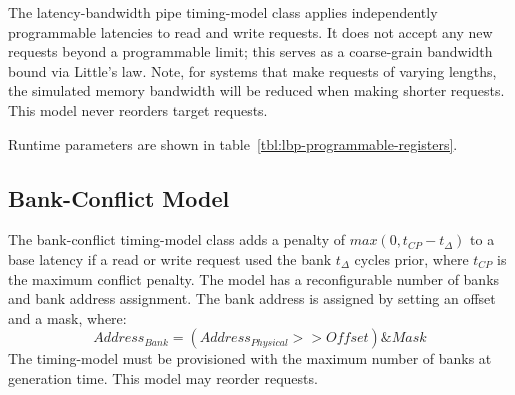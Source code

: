 The latency-bandwidth pipe timing-model class applies independently
programmable latencies to read and write requests. It does not accept any new
requests beyond a programmable limit; this serves as a coarse-grain bandwidth
bound via Little's law. Note, for systems that make requests of varying
lengths, the simulated memory bandwidth will be reduced when making shorter
requests. This model never reorders target requests.

\noindent Runtime parameters are shown in table~\ref{tbl:lbp-programmable-registers}.

\begin{table}
\begin{center}
\end{center}
\caption{Programmable registers of the latency-bandwidth pipe.}
\label{tbl:lbp-programmable-registers}
\end{table}%

\clearpage
\subsection{Bank-Conflict Model}\label{sec:bank-conflict}

The bank-conflict timing-model class adds a penalty of $max(0, t_{CP} - t_{\Delta})$ to a
base latency if a read or write request used the bank $t_{\Delta}$ cycles
prior, where $t_{CP}$ is the maximum conflict penalty. The model has a
reconfigurable number of banks and bank address assignment.  The bank address
is assigned by setting an offset and a mask, where: $$Address_{Bank} =
(Address_{Physical} >> Offset) \& Mask$$  The timing-model must be provisioned
with the maximum number of banks at generation time. This model may reorder requests.

